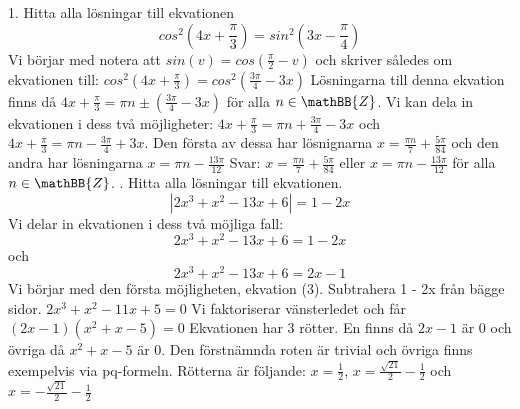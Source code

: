 \documentclass{article}
\begin{document}
  1. Hitta alla lösningar till ekvationen
  \begin{equation}
      cos^2(4x + \frac{\pi}{3}) = sin^2(3x-\frac{\pi}{4})
  \end{equation}
  Vi börjar med notera att $sin(v) = cos(\frac{\pi}{2} - v)$ och skriver således om ekvationen till: \newline\newline
  $cos^2(4x + \frac{\pi}{3}) = cos^2(\frac{3\pi}{4} - 3x)$\newline\newline
  Lösningarna till denna ekvation finns då $4x + \frac{\pi}{3} = \pi n \pm (\frac{3\pi}{4} - 3x)$ för alla $n \in \mathBB{Z}$. Vi kan dela in ekvationen i dess två möjligheter:\newline\newline
  $4x + \frac{\pi}{3} = \pi n + \frac{3\pi}{4} - 3x$ och $4x + \frac{\pi}{3} = \pi n - \frac{3\pi}{4} + 3x$.\newline\newline
  Den första av dessa har lösnignarna $x = \frac{\pi n}{7} + \frac{5\pi}{84}$ och den andra har lösningarna $x = \pi n - \frac{13\pi}{12}$\newline\newline
  Svar: $x = \frac{\pi n}{7} + \frac{5\pi}{84}$ eller $x = \pi n - \frac{13\pi}{12}$ för alla $n \in \mathBB{Z}$.
  \newline {}. Hitta alla lösningar till ekvationen. 
  \begin{equation}
      |2x^3 + x^2 - 13x + 6| = 1 - 2x
  \end{equation}
  Vi delar in ekvationen i dess två möjliga fall:
  \begin{equation}
      2x^3 + x^2 - 13x + 6 = 1 - 2x
  \end{equation}
  och 
  \begin{equation}
      2x^3 + x^2 - 13x + 6 = 2x - 1
  \end{equation}
  Vi börjar med den första möjligheten, ekvation (3). Subtrahera 1 - 2x från bägge sidor. \newline \newline
  $2x^3 + x^2 - 11x + 5 = 0$ \newline \newline
  Vi faktoriserar vänsterledet och får \newline \newline
  $(2x - 1)(x^2 + x - 5) = 0$ \newline \newline
  Ekvationen har 3 rötter. En finns då $2x - 1$ är 0 och övriga då $x^2 + x - 5$ är 0. Den förstnämnda roten är trivial och övriga finns exempelvis via pq-formeln. Rötterna är följande: $x = \frac{1}{2}$, $x = \frac{\sqrt{21}}{2} - \frac{1}{2}$ och $x = -\frac{\sqrt{21}}{2} - \frac{1}{2}$ \newline \newline
\end{document}
